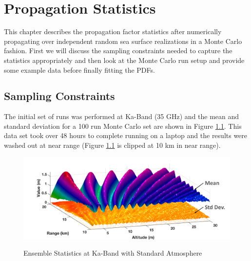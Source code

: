 \renewcommand{\baselinestretch}{2} \small\normalsize
\chapter{Propagation Statistics}
This chapter describes the propagation factor statistics after numerically propagating over independent random sea surface realizations in a Monte Carlo fashion. First we will discuss the sampling constraints needed to capture the statistics appropriately and then look at the Monte Carlo run setup and provide some example data before finally fitting the PDFs.

\section{Sampling Constraints}
The initial set of runs was performed at Ka-Band (35 GHz) and the mean and standard deviation for a 100 run Monte Carlo set are shown in Figure \ref{stat_fig:1}. This data set took over 48 hours to complete running on a laptop and the results were washed out at near range (Figure \ref{stat_fig:1} is clipped at 10 km in near range).

\begin{figure}[H]
  \begin{center}
\includegraphics[width=5in]{../media/statistics/ka_band_stats.png}
  \end{center}
  \renewcommand{\baselinestretch}{1} \small\normalsize
  \begin{quote}
    \caption[Ensemble Statistics at Ka-Band with Standard Atmosphere]{Ensemble Statistics at Ka-Band with Standard Atmosphere\label{stat_fig:1}}
  \end{quote}
\end{figure}
\renewcommand{\baselinestretch}{2} \small\normalsize

